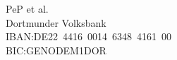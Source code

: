 PeP et al.\\
Dortmunder Volksbank\\
IBAN:\@ \mbox{DE22 4416 0014 6348 4161 00}\\
BIC:\@ GENODEM1DOR%